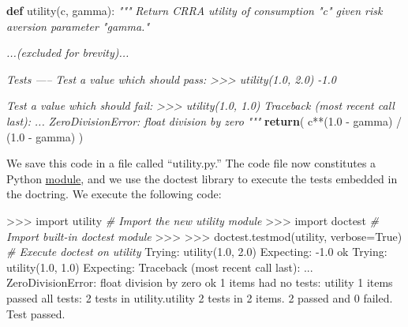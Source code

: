 \documentclass[]{article}
\newenvironment{Shaded}{}{}
\newcommand{\KeywordTok}[1]{\textcolor[rgb]{0.00,0.44,0.13}{\textbf{{#1}}}}
\newcommand{\DataTypeTok}[1]{\textcolor[rgb]{0.56,0.13,0.00}{{#1}}}
\newcommand{\DecValTok}[1]{\textcolor[rgb]{0.25,0.63,0.44}{{#1}}}
\newcommand{\FloatTok}[1]{\textcolor[rgb]{0.25,0.63,0.44}{{#1}}}
\newcommand{\CharTok}[1]{\textcolor[rgb]{0.25,0.44,0.63}{{#1}}}
\newcommand{\CommentTok}[1]{\textcolor[rgb]{0.38,0.63,0.69}{\textit{{#1}}}}
\newcommand{\OtherTok}[1]{\textcolor[rgb]{0.00,0.44,0.13}{{#1}}}
\newcommand{\NormalTok}[1]{{#1}}
\begin{document}
\begin{Shaded}
\begin{Highlighting}[]
\KeywordTok{def} \NormalTok{utility(c, gamma):}
    \CommentTok{"""}
\CommentTok{    Return CRRA utility of consumption "c" given risk aversion parameter "gamma."}

\CommentTok{    ...(excluded for brevity)...}

\CommentTok{    Tests}
\CommentTok{    -----}
\CommentTok{    Test a value which should pass:}
\CommentTok{    >>> utility(1.0, 2.0)}
\CommentTok{    -1.0}

\CommentTok{    Test a value which should fail:}
\CommentTok{    >>> utility(1.0, 1.0)}
\CommentTok{    Traceback (most recent call last):}
\CommentTok{        ...}
\CommentTok{    ZeroDivisionError: float division by zero}
\CommentTok{    """}
    \KeywordTok{return}\NormalTok{( c**(}\FloatTok{1.0} \NormalTok{- gamma) / (}\FloatTok{1.0} \NormalTok{- gamma) )}
\end{Highlighting}
\end{Shaded}

We save this code in a file called ``utility.py.'' The code file now
constitutes a Python
\href{https://docs.python.org/2/tutorial/modules.html}{module}, and we
use the doctest library to execute the tests embedded in the doctring.
We execute the following code:

\begin{Shaded}
\begin{Highlighting}[]
\NormalTok{>>> }\CharTok{import} \NormalTok{utility      }\CommentTok{# Import the new utility module}
\NormalTok{>>> }\CharTok{import} \NormalTok{doctest      }\CommentTok{# Import built-in doctest module}
\NormalTok{>>>}
\NormalTok{>>> doctest.testmod(utility, verbose=}\OtherTok{True}\NormalTok{)  }\CommentTok{# Execute doctest on utility}
\NormalTok{Trying:}
    \NormalTok{utility(}\FloatTok{1.0}\NormalTok{, }\FloatTok{2.0}\NormalTok{)}
\NormalTok{Expecting:}
    \NormalTok{-}\FloatTok{1.0}
\NormalTok{ok}
\NormalTok{Trying:}
    \NormalTok{utility(}\FloatTok{1.0}\NormalTok{, }\FloatTok{1.0}\NormalTok{)}
\NormalTok{Expecting:}
    \NormalTok{Traceback (most recent call last):}
        \NormalTok{...}
    \OtherTok{ZeroDivisionError}\NormalTok{: }\DataTypeTok{float} \NormalTok{division by zero}
\NormalTok{ok}
\DecValTok{1} \NormalTok{items had no tests:}
    \NormalTok{utility}
\DecValTok{1} \NormalTok{items passed }\DataTypeTok{all} \NormalTok{tests:}
   \DecValTok{2} \NormalTok{tests in utility.utility}
\DecValTok{2} \NormalTok{tests in }\DecValTok{2} \NormalTok{items.}
\DecValTok{2} \NormalTok{passed and }\DecValTok{0} \NormalTok{failed.}
\NormalTok{Test passed.}
\end{Highlighting}
\end{Shaded}
\end{document}
